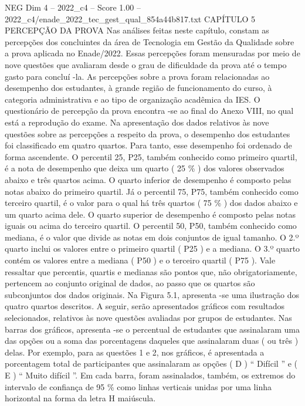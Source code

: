 \begin{textsample}{NEG Dim 4 – 2022\_c4 – Score 1.00 – 2022\_c4/enade\_2022\_tec\_gest\_qual\_854a44b817.txt}  \label{ex:f4_neg_210}
CAPÍTULO 5 PERCEPÇÃO DA PROVA Nas análises feitas neste capítulo, constam as percepções dos concluintes da área de Tecnologia em Gestão da Qualidade sobre a prova aplicada no Enade/2022.
Essas percepções foram mensuradas por meio de nove questões que avaliaram desde o grau de dificuldade da prova até o tempo gasto para concluí -la.
As percepções sobre a prova foram relacionadas ao desempenho dos estudantes, à grande região de funcionamento do curso, à categoria administrativa e ao tipo de organização acadêmica da IES.
O questionário de percepção da prova encontra -se ao final do Anexo VIII, no qual está a reprodução do exame.
Na apresentação dos dados relativos às nove questões sobre as percepções a respeito da prova, o desempenho dos estudantes foi classificado em quatro quartos.
Para tanto, esse desempenho foi ordenado de forma ascendente.
O percentil 25, P25, também conhecido como primeiro quartil, é a nota de desempenho que deixa um quarto ( 25 \% ) dos valores observados abaixo e três quartos acima.
O quarto inferior de desempenho é composto pelas notas abaixo do primeiro quartil.
Já o percentil 75, P75, também conhecido como terceiro quartil, é o valor para o qual há três quartos ( 75 \% ) dos dados abaixo e um quarto acima dele.
O quarto superior de desempenho é composto pelas notas iguais ou acima do terceiro quartil.
O percentil 50, P50, também conhecido como mediana, é o valor que divide as notas em dois conjuntos de igual tamanho.
O 2.º quarto inclui os valores entre o primeiro quartil ( P25 ) e a mediana.
O 3.º quarto contém os valores entre a mediana ( P50 ) e o terceiro quartil ( P75 ).
Vale ressaltar que percentis, quartis e medianas são pontos que, não obrigatoriamente, pertencem ao conjunto original de dados, ao passo que os quartos são subconjuntos dos dados originais.
Na Figura 5.1, apresenta -se uma ilustração dos quatro quartos descritos.
A seguir, serão apresentados gráficos com resultados selecionados, relativos às nove questões avaliadas por grupos de estudantes.
Nas barras dos gráficos, apresenta -se o percentual de estudantes que assinalaram uma das opções ou a soma das porcentagens daqueles que assinalaram duas ( ou três ) delas.
Por exemplo, para as questões 1 e 2, nos gráficos, é apresentada a porcentagem total de participantes que assinalaram as opções ( D ) “ Difícil ” e ( E ) “ Muito difícil ”.
Em cada barra, foram assinalados, também, os extremos do intervalo de confiança de 95 \% como linhas verticais unidas por uma linha horizontal na forma da letra H maiúscula.

\end{textsample}
